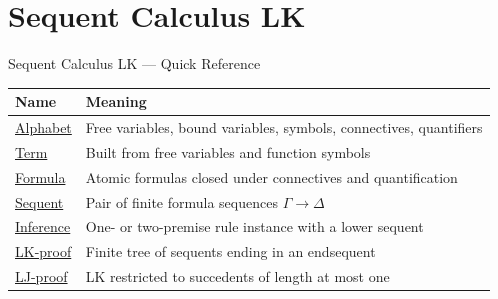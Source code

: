 \section{Sequent Calculus LK}

\begin{toolkitbox}{Sequent Calculus LK --- Quick Reference}
\small
\begin{tabular}{l l}
\toprule
\textbf{Name} & \textbf{Meaning} \\
\midrule
\hyperref[def:lk-alphabet]{Alphabet} & Free variables, bound variables, symbols, connectives, quantifiers \\
\hyperref[def:lk-term]{Term} & Built from free variables and function symbols \\
\hyperref[def:lk-formula]{Formula} & Atomic formulas closed under connectives and quantification \\
\hyperref[def:lk-sequent]{Sequent} & Pair of finite formula sequences $\Gamma \to \Delta$ \\
\hyperref[def:lk-inference]{Inference} & One- or two-premise rule instance with a lower sequent \\
\hyperref[def:lk-proof]{LK-proof} & Finite tree of sequents ending in an endsequent \\
\hyperref[def:lj-proof]{LJ-proof} & LK restricted to succedents of length at most one \\
\bottomrule
\end{tabular}
\end{toolkitbox}


